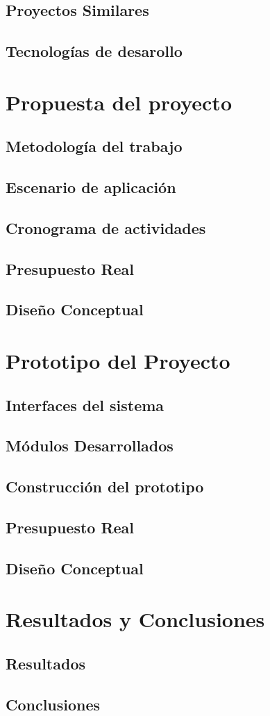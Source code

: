 \documentclass{extbook}
\begin{document}
  \section{Proyectos Similares}
    
  \section{Tecnologías de desarollo}
    

\chapter{Propuesta del proyecto}
  \section{Metodología del trabajo}
  \section{Escenario de aplicación}
  \section{Cronograma de actividades}
    
  \section{Presupuesto Real}
  \section{Diseño Conceptual}

\chapter{Prototipo del Proyecto}
  \section{Interfaces del sistema}
  \section{Módulos Desarrollados}
  \section{Construcción del prototipo}
  \section{Presupuesto Real}
  \section{Diseño Conceptual}

\chapter{Resultados y Conclusiones}
  \section{Resultados}
  \section{Conclusiones}


\end{document}

